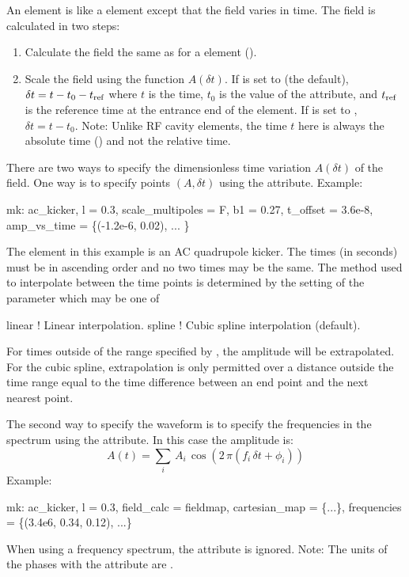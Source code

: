 An  element is like a  element except that the field varies in time. The
field is calculated in two steps:
\begin{enumerate}
\item Calculate the field the same as for a  element ().
\item Scale the field using the function $A(\delta t)$. If  is set to  (the 
default), $\delta t = t - t_0 - t_{\text{ref}}$ where $t$ is the time, $t_0$ is the value of the
 attribute, and $t_{\text{ref}}$ is the reference time at the entrance end of the element. If
 is set to , $\delta t = t - t_0$. Note: Unlike RF cavity elements,
the time $t$ here is always the absolute time () and not the relative time.
\end{enumerate}

There are two ways to specify the dimensionless time variation $A(\delta t)$ of the field. One way
is to specify points $(A, \delta t)$ using the  attribute. Example:
\begin{example}
  mk: ac_kicker, l = 0.3, scale_multipoles = F, b1 = 0.27, t_offset = 3.6e-8,
          amp_vs_time = \{(-1.2e-6, 0.02), ... \} 
\end{example}
The element in this example is an AC quadrupole kicker. The times (in seconds) must be in ascending
order and no two times may be the same. The method used to interpolate between the time points is
determined by the setting of the  parameter which may be one of
\begin{example}
  linear      ! Linear interpolation.
  spline      ! Cubic spline interpolation (default).
\end{example}
For times outside of the range specified by , the amplitude will be extrapolated.
For the cubic spline, extrapolation is only permitted over a distance outside the time range equal
to the time difference between an end point and the next nearest point.

The second way to specify the waveform is to specify the frequencies in the spectrum using the
 attribute. In this case the amplitude is:
\begin{equation}
  A(t) = \sum_i \, A_i \, \cos( 2 \, \pi (f_i \, \delta t + \phi_i))
\end{equation}
Example:
\begin{example}
  mk: ac_kicker, l = 0.3, field_calc = fieldmap, cartesian_map = \{...\},
          frequencies = \{(3.4e6, 0.34, 0.12), ...\}
\end{example}
When using a frequency spectrum, the  attribute is ignored. Note: The units of the
phases  with the  attribute are .

